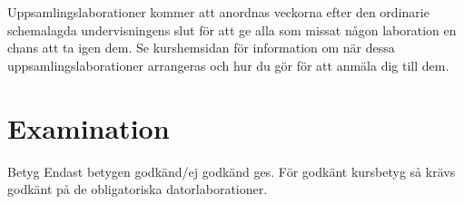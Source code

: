 \documentclass[a4paper]{memoir}
\begin{document}
\begin{Items}


    Uppsamlingslaborationer kommer att anordnas veckorna efter den ordinarie schemalagda undervisningens slut för att ge alla som missat någon laboration en chans att ta igen dem. Se kurshemsidan för information om när dessa uppsamlingslaborationer arrangeras och hur du gör för att anmäla dig till dem.

\end{Items}


\section*{Examination}


\begin{Items}
    \item[Betyg]
    Endast betygen godkänd/ej godkänd ges. För godkänt kursbetyg så krävs godkänt på de obligatoriska datorlaborationer.
\end{Items}
\end{document}
